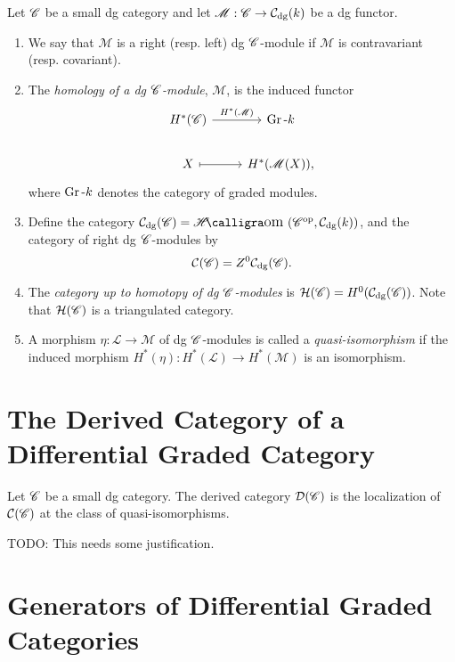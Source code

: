 \documentclass[dissertation.tex]{subfiles}
\begin{document}
\begin{defn}
  Let $\mathscr{C}$ be a small dg category and let $\mathscr{M} : \mathscr{C} \rightarrow \mathcal{C}_\text{dg}(k)$ be a dg functor.
  \begin{enumerate}
  \item
    We say that $\mathscr{M}$ is a right (resp. left) dg $\mathscr{C}$-module if $\mathscr{M}$ is contravariant (resp. covariant).
  \item
    The {\it homology of a dg $\mathscr{C}$-module}, $\mathscr{M}$, is the induced functor
    $$\begin{tikzcd}
      H^\ast(\CC) \arrow{r}{H^\ast(\mathscr{M})}& \Gr{k}\\
      X \arrow[mapsto]{r} & H^\ast(\mathscr{M}(X)),
    \end{tikzcd}$$
    where $\operatorname{Gr}\text{-}k$ denotes the category of graded modules.
  \item
    Define the category $\mathcal{C}_\text{dg}(\CC) = \SHom{\CC^\text{op}, \mathcal{C}_\text{dg}(k)}$, and the category of right dg $\mathscr{C}$-modules by
    $$\mathcal{C}(\mathscr{C}) = Z^0 \mathcal{C}_\text{dg}(\mathscr{C}).$$
  \item
    The {\it category up to homotopy of dg $\mathscr{C}$-modules} is $\mathcal{H}(\mathscr{C}) = H^0(\mathcal{C}_\text{dg}(\mathscr{C}))$.
    Note that $\mathcal{H}(\mathscr{C})$ is a triangulated category.
  \item
    A morphism $\eta \colon \mathscr{L} \rightarrow \mathscr{M}$ of dg $\mathscr{C}$-modules is called a {\it quasi-isomorphism} if the induced morphism $H^\ast(\eta) \colon H^\ast(\mathscr{L}) \rightarrow H^\ast(\mathscr{M})$ is an isomorphism.
  \end{enumerate}
\end{defn}

\section{The Derived Category of a Differential Graded Category}
\begin{defn}
  Let $\mathscr{C}$ be a small dg category.
  The derived category $\mathcal{D}(\mathscr{C})$ is the localization of $\mathcal{C}(\mathscr{C})$ at the class of quasi-isomorphisms.

  TODO: This needs some justification.
\end{defn}

\section{Generators of Differential Graded Categories}
\end{document}
